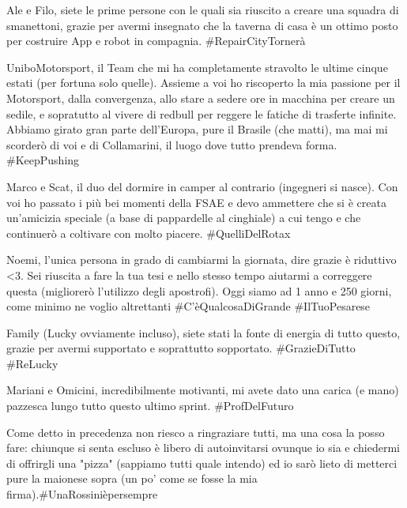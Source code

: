 \documentclass[12pt,a4paper,italian]{book}
\begin{document}
\medskip

\noindent Ale e Filo, siete le prime persone con le quali sia riuscito a creare una squadra di smanettoni, grazie per avermi insegnato che la taverna di casa è un ottimo posto per costruire App e robot in compagnia. \#RepairCityTornerà

\medskip 

\noindent UniboMotorsport, il Team che mi ha completamente stravolto le ultime cinque estati (per fortuna solo quelle). Assieme a voi ho riscoperto la mia passione per il Motorsport, dalla convergenza, allo stare a sedere ore in macchina per creare un sedile, e sopratutto al vivere di redbull per reggere le fatiche di trasferte infinite. Abbiamo girato gran parte dell'Europa, pure il Brasile (che matti), ma mai mi scorderò di voi e di Collamarini, il luogo dove tutto prendeva forma. \#KeepPushing

\medskip 

\noindent Marco e Scat, il duo del dormire in camper al contrario (ingegneri si nasce). Con voi ho passato i più bei momenti della FSAE e devo ammettere che si è creata un'amicizia speciale (a base di pappardelle al cinghiale) a cui tengo e che continuerò a coltivare con molto piacere. \#QuelliDelRotax

\medskip

\noindent Noemi, l'unica persona in grado di cambiarmi la giornata, dire grazie è riduttivo <3. Sei riuscita a fare la tua tesi e nello stesso tempo aiutarmi a correggere questa (migliorerò l'utilizzo degli apostrofi). Oggi siamo ad 1 anno e 250 giorni, come minimo ne voglio altrettanti \#C'èQualcosaDiGrande \#IlTuoPesarese 

\medskip

\noindent Family (Lucky ovviamente incluso), siete stati la fonte di energia di tutto questo, grazie per avermi supportato e soprattutto sopportato. \#GrazieDiTutto \#ReLucky

\medskip

\noindent Mariani e Omicini, incredibilmente motivanti, mi avete dato una carica (e mano) pazzesca lungo tutto questo ultimo sprint. \#ProfDelFuturo

\medskip

\noindent Come detto in precedenza non riesco a ringraziare tutti, ma una cosa la posso fare: chiunque si senta escluso è libero di autoinvitarsi ovunque io sia e chiedermi di offrirgli una "pizza" (sappiamo tutti quale intendo) ed io sarò lieto di metterci pure la maionese sopra (un po' come se fosse la mia firma).\#UnaRossinièpersempre 


%
\backmatter

\listoffigures
\lstlistoflistings



\end{document}
